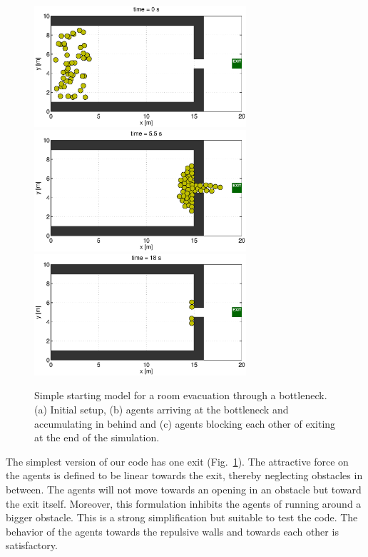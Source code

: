 \documentclass[11pt]{article}
\begin{document}
\begin{figure}
	\begin{center}
	\includegraphics[width=0.7\textwidth]
	{figures/Model1_direct_1b_000000.eps}
	\qquad
	\includegraphics[width=0.7\textwidth]
	{figures/Model1_direct_1b_000550.eps}
	\qquad
	\includegraphics[width=0.7\textwidth]
	{figures/Model1_direct_1b_001800.eps}
	\caption{Simple starting model for a room evacuation through a bottleneck. (a) Initial setup, (b) agents arriving at the bottleneck and accumulating in behind and (c) agents blocking each other of exiting at the end of the simulation.}
	\label{fig:simple1}
	\end{center}
\end{figure}

The simplest version of our code has one exit (Fig.~\ref{fig:simple1}). The attractive force on the agents is defined to be linear towards the exit, thereby neglecting obstacles in between. The agents will not move towards an opening in an obstacle but toward the exit itself. Moreover, this formulation inhibits the agents of running around a bigger obstacle. This is a strong simplification but suitable to test the code. The behavior of the agents towards the repulsive walls and towards each other is satisfactory.
\end{document}
